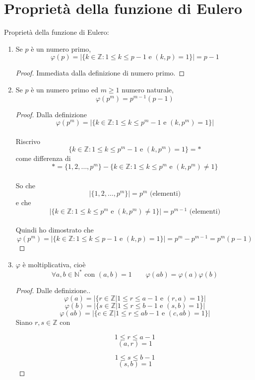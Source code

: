 \documentclass[a4paper,12pt, oneside]{book}
\begin{document}
	\section{Proprietà della funzione di Eulero}
		Proprietà della funzione di Eulero:
		\begin{enumerate}
			\item Se $p$ è un numero primo,
				$$\varphi(p)=|\{ k \in \mathbb{Z} : 1 \leq k \leq p-1 \mbox{ e } (k,p)=1  \}| = p-1$$
				\begin{proof}
					Immediata dalla definizione di numero primo.
				\end{proof}
			\item Se $p$ è un numero primo ed $m \geq 1$ numero naturale,
				$$\varphi(p^m) = p^{m-1}(p-1)$$
				\begin{proof}
					Dalla definizione
					$$\varphi(p^m)=|\{ k \in \mathbb{Z} : 1 \leq k \leq p^m-1 \mbox{ e } (k,p^m)=1 \}|$$\\
					Riscrivo
					$$\{ k \in \mathbb{Z} : 1 \leq k \leq p^m-1 \mbox{ e } (k,p^m)=1 \} = *$$
					come differenza di
					$$* = \{ 1,2,\dots, p^m \} - \{ k \in \mathbb{Z} : 1 \leq k \leq p^m \mbox{ e } (k,p^m) \not= 1 \}$$\\
					So che $$|\{ 1,2,\dots, p^m \}| = p^m \mbox{ (elementi)}$$
					e che $$|\{ k \in \mathbb{Z} : 1 \leq k \leq p^m \mbox{ e } (k,p^m) \not= 1 \}| = p^{m-1} \mbox{ (elementi)}$$\\
					Quindi ho dimostrato che
					$$\varphi(p^m)=|\{ k \in \mathbb{Z} : 1 \leq k \leq p-1 \mbox{ e } (k,p)=1  \}| = p^m - p^{m-1} = p^m(p-1)$$
				\end{proof}
			\item $\varphi$ è moltiplicativa, cioè
				$$\forall a, b \in \mathbb{N}^* \mbox{ con } (a,b)=1 \qquad \varphi(ab)=\varphi(a)\varphi(b)$$
				\begin{proof}
					Dalle definizione..
					$$\varphi(a) =  |\{ r \in \mathbb{Z} | 1 \leq r \leq a-1  \mbox{ e } (r,a) =1 \}|$$
					$$\varphi(b) =  |\{ s \in \mathbb{Z} | 1 \leq r \leq b-1  \mbox{ e } (s,b) =1 \}|$$
					$$\varphi(ab) = |\{ c \in \mathbb{Z} | 1 \leq r \leq ab-1 \mbox{ e } (c,ab)=1 \}|$$
					Siano $r,s \in \mathbb{Z}$ con\\
					\begin{minipage}{0.45\textwidth}
						$$1 \leq r \leq a-1$$
						$$(a,r) =1$$
					\end{minipage}%
					\hfill
					\begin{minipage}{0.45\textwidth}
						$$1 \leq s \leq b-1$$
						$$(s,b) =1$$
					\end{minipage}%
					

\end{proof}
\end{enumerate}
\end{document}
